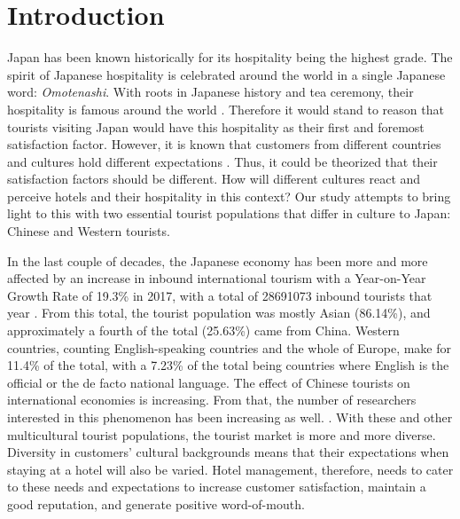 \documentclass[smallextended,natbib]{svjour3}       %
\begin{document}
\linenumbers

\section{Introduction}\label{intro}

  Japan has been known historically for its hospitality being the highest grade. The spirit of Japanese hospitality is celebrated around the world in a single Japanese word: \textit{Omotenashi}. With roots in Japanese history and tea ceremony, their hospitality is famous around the world \cite{al2015characteristics}. Therefore it would stand to reason that tourists visiting Japan would have this hospitality as their first and foremost satisfaction factor. However, it is known that customers from different countries and cultures hold different expectations \cite{engel1990}. Thus, it could be theorized that their satisfaction factors should be different. How will different cultures react and perceive hotels and their hospitality in this context? Our study attempts to bring light to this with two essential tourist populations that differ in culture to Japan: Chinese and Western tourists. 

  In the last couple of decades, the Japanese economy has been more and more affected by an increase in inbound international tourism \cite[][]{jones2009} with a Year-on-Year Growth Rate of 19.3\% in 2017, with a total of \num[group-separator={,}]{28691073} inbound tourists that year \cite[][]{jnto2003-2019}. From this total, the tourist population was mostly Asian (86.14\%), and approximately a fourth of the total (25.63\%) came from China. Western countries, counting English-speaking countries and the whole of Europe, make for 11.4\% of the total, with a 7.23\% of the total being countries where English is the official or the de facto national language. The effect of Chinese tourists on international economies is increasing. From that, the number of researchers interested in this phenomenon has been increasing as well. \cite[][]{sun2017}. With these and other multicultural tourist populations, the tourist market is more and more diverse. Diversity in customers' cultural backgrounds means that their expectations when staying at a hotel will also be varied. Hotel management, therefore, needs to cater to these needs and expectations to increase customer satisfaction, maintain a good reputation, and generate positive word-of-mouth.
\end{document}

